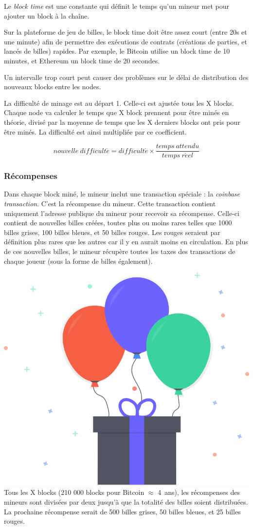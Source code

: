 \documentclass{article}
\begin{document}
Le \textit{block time} est une constante qui définit le temps qu’un mineur met pour ajouter un block à la chaîne.

Sur la plateforme de jeu de billes, le block time doit être assez court (entre 20s et une minute) afin de permettre des exécutions de contrats (créations de parties, et lancés de billes) rapides. Par exemple, le Bitcoin utilise un block time de 10 minutes, et Ethereum un block time de 20 secondes.

Un intervalle trop court peut causer des problèmes sur le délai de distribution des nouveaux blocks entre les nodes.

La difficulté de minage est au départ 1. Celle-ci est ajustée tous les X
blocks. Chaque node va calculer le temps que X block prennent pour être minés en théorie, divisé par la moyenne de temps que les X derniers blocks ont pris pour être minés. La difficulté est ainsi multipliée par ce coefficient.

\[ nouvelle\ difficult\acute{e} = difficult\acute{e} \times \frac{temps\ attendu}{temps\ r\acute{e}el} \]

\subsubsection{Récompenses}
Dans chaque block miné, le mineur inclut une transaction spéciale : la \textit{coinbase transaction}. C'est la récompense du mineur.
Cette transaction contient uniquement l'adresse publique du mineur pour recevoir sa récompense.
Celle-ci contient de nouvelles billes créées, toutes plus ou moins rares telles que 1000 billes grises, 100 billes bleues, et 50 billes rouges. Les rouges seraient par définition plus rares que les autres car il y en aurait moins en circulation.
En plus de ces nouvelles billes, le mineur récupère toutes les taxes des transactions de chaque joueur (sous la forme de billes également).

\includegraphics[width=0.3\linewidth]{assets/gift.png}\\

Tous les X blocks (210 000 blocks pour Bitcoin $\approx$ 4\ ans), les récompenses des mineurs sont divisées par deux jusqu'à que la totalité des billes soient distribuées.
La prochaine récompense serait de 500 billes grises, 50 billes bleues, et 25 billes rouges.
\end{document}
